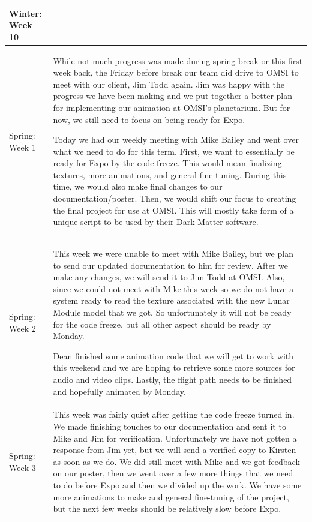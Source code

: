 \documentclass[onecolumn, draftclsnofoot,10pt, compsoc]{IEEEtran}
\begin{document}
\begin{longtable} {|p{1.5cm}|p{13.5cm}|}
Winter: Week 10 & 
\\ \hline

Spring: Week 1 & While not much progress was made during spring break or this first week back, the Friday before break our team did drive to OMSI to meet with our client, Jim Todd again. Jim was happy with the progress we have been making and we put together a better plan for implementing our animation at OMSI's planetarium. But for now, we still need to focus on being ready for Expo.

Today we had our weekly meeting with Mike Bailey and went over what we need to do for this term. First, we want to essentially be ready for Expo by the code freeze. This would mean finalizing textures, more animations, and general fine-tuning. During this time, we would also make final changes to our documentation/poster. Then, we would shift our focus to creating the final project for use at OMSI. This will mostly take form of a unique script to be used by their Dark-Matter software. 
\\ \hline

Spring: Week 2 & This week we were unable to meet with Mike Bailey, but we plan to send our updated documentation to him for review. After we make any changes, we will send it to Jim Todd at OMSI. Also, since we could not meet with Mike this week so we do not have a system ready to read the texture associated with the new Lunar Module model that we got. So unfortunately it will not be ready for the code freeze, but all other aspect should be ready by Monday. 

Dean finished some animation code that we will get to work with this weekend and we are hoping to retrieve some more sources for audio and video clips. Lastly, the flight path needs to be finished and hopefully animated by Monday.
\\ \hline

Spring: Week 3 & 
This week was fairly quiet after getting the code freeze turned in. We made finishing touches to our documentation and sent it to Mike and Jim for verification. Unfortunately we have not gotten a response from Jim yet, but we will send a verified copy to Kirsten as soon as we do. We did still meet with Mike and we got feedback on our poster, then we went over a few more things that we need to do before Expo and then we divided up the work. We have some more animations to make and general fine-tuning of the project, but the next few weeks should be relatively slow before Expo. 
\\ \hline


\end{longtable}
\end{document}

